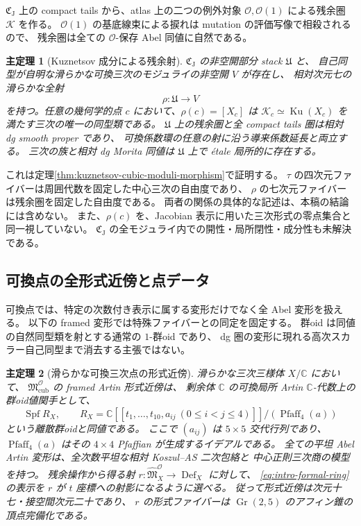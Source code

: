 \documentclass[11pt,a4paper]{ltjsarticle}
\numberwithin{equation}{section}
\newtheorem{maintheorem}{主定理}
\newcommand{\C}{\mathbb C}
\begin{document}
$\mathfrak C_{\mathrm J}$ 上の compact tails から、atlas 上の二つの例外対象
$\mathcal O,\mathcal O(1)$ による残余圏 $\mathcal K$ を作る。
$\mathcal O(1)$ の基底線束による捩れは mutation の評価写像で相殺されるので、
残余圏は全ての $\mathcal O$-保存 Abel 同値に自然である。

\begin{maintheorem}[Kuznetsov 成分による残余射]\label{thm:intro-residual}
$\mathfrak C_{\mathrm J}$ の非空開部分 stack $\mathfrak U$ と、
自己同型が自明な滑らかな可換三次のモジュライの非空開 $V$ が存在し、
相対次元七の滑らかな全射
\[
 \rho:\mathfrak U\longrightarrow V
\]
を持つ。任意の幾何学的点 $c$ において、$\rho(c)=[X_c]$ は
$\mathcal K_c\simeq\operatorname{Ku}(X_c)$ を満たす三次の唯一の同型類である。
$\mathfrak U$ 上の残余圏と全 compact tails 圏は相対 dg smooth proper であり、
可換係数環の任意の射に沿う導来係数延長と両立する。
三次の族と相対 dg Morita 同値は $\mathfrak U$ 上で étale 局所的に存在する。
\end{maintheorem}

これは定理\ref{thm:kuznetsov-cubic-moduli-morphism}で証明する。
$\tau$ の四次元ファイバーは周囲代数を固定した中心三次の自由度であり、
$\rho$ の七次元ファイバーは残余圏を固定した自由度である。
両者の関係の具体的な記述は、本稿の結論には含めない。
また、$\rho(c)$ を、Jacobian 表示に用いた三次形式の零点集合と同一視していない。
$\mathfrak C_{\mathrm J}$ の全モジュライ内での開性・局所閉性・成分性も未解決である。

\subsection{可換点の全形式近傍と点データ}

可換点では、特定の次数付き表示に属する変形だけでなく全 Abel 変形を扱える。
以下の framed 変形では特殊ファイバーとの同定を固定する。
群oid は同値の自然同型類を射とする通常の $1$-群oid であり、
dg 圏の変形に現れる高次スカラー自己同型まで消去する主張ではない。

\begin{maintheorem}[滑らかな可換三次点の形式近傍]\label{thm:intro-formal}
滑らかな三次三様体 $X/\C$ において、
$\mathfrak M^{\mathcal O}_{\mathrm{cub}}$ の framed Artin 形式近傍は、
剰余体 $\C$ の可換局所 Artin $\C$-代数上の群oid値関手として、
\begin{equation}\label{eq:intro-formal-ring}
 \operatorname{Spf} R_X,\qquad
 R_X=\C[[t_1,\ldots,t_{10},a_{ij}\ (0\le i<j\le4)]]
           /(\operatorname{Pfaff}_4(a))
\end{equation}
という離散群oidと同値である。
ここで $(a_{ij})$ は $5\times5$ 交代行列であり、
$\operatorname{Pfaff}_4(a)$ はその $4\times4$ Pfaffian が生成するイデアルである。
全ての平坦 Abel Artin 変形は、全次数平坦な相対 Koszul--AS 二次包絡と
中心正則三次商の模型を持つ。
残余操作から得る射 $r:\widehat{\mathfrak M}^{\mathcal O}_{X}\to\operatorname{Def}_X$ に対して、
\eqref{eq:intro-formal-ring}の表示を $r$ が $t$ 座標への射影になるように選べる。
従って形式近傍は次元十七・接空間次元二十であり、
$r$ の形式ファイバーは $\operatorname{Gr}(2,5)$ のアフィン錐の頂点完備化である。
\end{maintheorem}
\end{document}
